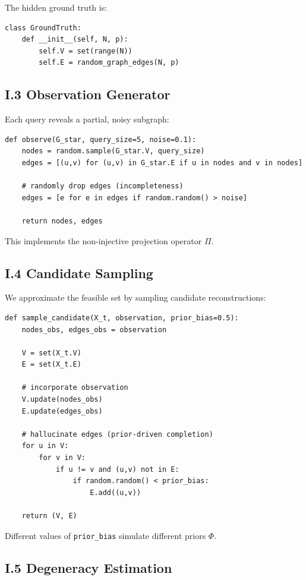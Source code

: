 \documentclass[12pt, oneside]{article}
\theoremstyle{plain}
\theoremstyle{definition}
\theoremstyle{remark}
\begin{document}
The hidden ground truth is:

\begin{verbatim}
class GroundTruth:
    def __init__(self, N, p):
        self.V = set(range(N))
        self.E = random_graph_edges(N, p)
\end{verbatim}

\subsection{I.3 Observation Generator}

Each query reveals a partial, noisy subgraph:

\begin{verbatim}
def observe(G_star, query_size=5, noise=0.1):
    nodes = random.sample(G_star.V, query_size)
    edges = [(u,v) for (u,v) in G_star.E if u in nodes and v in nodes]

    # randomly drop edges (incompleteness)
    edges = [e for e in edges if random.random() > noise]

    return nodes, edges
\end{verbatim}

This implements the non-injective projection operator $\Pi$.

\subsection{I.4 Candidate Sampling}

We approximate the feasible set by sampling candidate reconstructions:

\begin{verbatim}
def sample_candidate(X_t, observation, prior_bias=0.5):
    nodes_obs, edges_obs = observation

    V = set(X_t.V)
    E = set(X_t.E)

    # incorporate observation
    V.update(nodes_obs)
    E.update(edges_obs)

    # hallucinate edges (prior-driven completion)
    for u in V:
        for v in V:
            if u != v and (u,v) not in E:
                if random.random() < prior_bias:
                    E.add((u,v))

    return (V, E)
\end{verbatim}

Different values of \texttt{prior\_bias} simulate different priors $\Phi$.

\subsection{I.5 Degeneracy Estimation}
\end{document}
